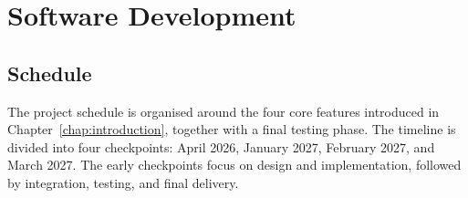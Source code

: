 \chapter{Software Development}




\section{Schedule}
\label{section:schedule}

The project schedule is organised around the four core features introduced in Chapter~\ref{chap:introduction}, together with a final testing phase. The timeline is divided into four checkpoints: April 2026, January 2027, February 2027, and March 2027. The early checkpoints focus on design and implementation, followed by integration, testing, and final delivery.

